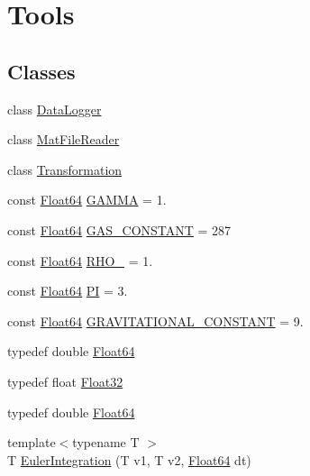 \hypertarget{group___tools}{}\section{Tools}
\label{group___tools}
\subsection*{Classes}
\begin{DoxyCompactItemize}
\item 
class \hyperlink{class_data_logger}{Data\+Logger}
\item 
class \hyperlink{class_mat_file_reader}{Mat\+File\+Reader}
\item 
class \hyperlink{class_transformation}{Transformation}
\end{DoxyCompactItemize}
\begin{DoxyCompactItemize}
\item 
const \hyperlink{group___tools_ga3f1431cb9f76da10f59246d1d743dc2c}{Float64} \hyperlink{group___tools_ga6e7b8e4a71fb3f6d37718ac5d614f560}{G\+A\+M\+MA} = 1.
\item 
const \hyperlink{group___tools_ga3f1431cb9f76da10f59246d1d743dc2c}{Float64} \hyperlink{group___tools_ga50141cecfc14099c41bee22b4f166637}{G\+A\+S\+\_\+\+C\+O\+N\+S\+T\+A\+NT} = 287
\item 
const \hyperlink{group___tools_ga3f1431cb9f76da10f59246d1d743dc2c}{Float64} \hyperlink{group___tools_ga4350dd604b08011751eaca3d76213582}{R\+H\+O\+\_} = 1.
\item 
const \hyperlink{group___tools_ga3f1431cb9f76da10f59246d1d743dc2c}{Float64} \hyperlink{group___tools_gac3a28ac509d7e1dff951cc777889cc93}{PI} = 3.
\item 
const \hyperlink{group___tools_ga3f1431cb9f76da10f59246d1d743dc2c}{Float64} \hyperlink{group___tools_gad0d838a1206faf55a621d5ec8f1e896d}{G\+R\+A\+V\+I\+T\+A\+T\+I\+O\+N\+A\+L\+\_\+\+C\+O\+N\+S\+T\+A\+NT} = 9.
\end{DoxyCompactItemize}
\begin{DoxyCompactItemize}
\item 
typedef double \hyperlink{group___tools_ga3f1431cb9f76da10f59246d1d743dc2c}{Float64}
\item 
typedef float \hyperlink{group___tools_ga87d38f886e617ced2698fc55afa07637}{Float32}
\end{DoxyCompactItemize}
\begin{DoxyCompactItemize}
\item 
typedef double \hyperlink{group___tools_ga3f1431cb9f76da10f59246d1d743dc2c}{Float64}
\item 
{\footnotesize template$<$typename T $>$ }\\T \hyperlink{group___tools_ga33942ddaef2c066dde4aac1457e7ed9d}{Euler\+Integration} (T v1, T v2, \hyperlink{group___tools_ga3f1431cb9f76da10f59246d1d743dc2c}{Float64} dt)
\end{DoxyCompactItemize}


